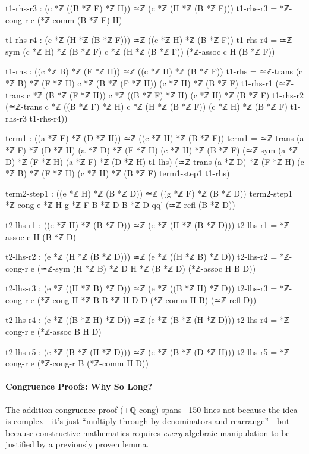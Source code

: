 \documentclass[11pt,a4paper]{book}
\def\texttt#1{#1}%
\begin{document}
\begin{code}
    t1-rhs-r3 : (c *ℤ ((B *ℤ F) *ℤ H)) ≃ℤ (c *ℤ (H *ℤ (B *ℤ F)))
    t1-rhs-r3 = *ℤ-cong-r c (*ℤ-comm (B *ℤ F) H)
    
    t1-rhs-r4 : (c *ℤ (H *ℤ (B *ℤ F))) ≃ℤ ((c *ℤ H) *ℤ (B *ℤ F))
    t1-rhs-r4 = ≃ℤ-sym {(c *ℤ H) *ℤ (B *ℤ F)} {c *ℤ (H *ℤ (B *ℤ F))} (*ℤ-assoc c H (B *ℤ F))
    
    t1-rhs : ((c *ℤ B) *ℤ (F *ℤ H)) ≃ℤ ((c *ℤ H) *ℤ (B *ℤ F))
    t1-rhs = ≃ℤ-trans {(c *ℤ B) *ℤ (F *ℤ H)} {c *ℤ (B *ℤ (F *ℤ H))} {(c *ℤ H) *ℤ (B *ℤ F)} t1-rhs-r1
             (≃ℤ-trans {c *ℤ (B *ℤ (F *ℤ H))} {c *ℤ ((B *ℤ F) *ℤ H)} {(c *ℤ H) *ℤ (B *ℤ F)} t1-rhs-r2
             (≃ℤ-trans {c *ℤ ((B *ℤ F) *ℤ H)} {c *ℤ (H *ℤ (B *ℤ F))} {(c *ℤ H) *ℤ (B *ℤ F)} t1-rhs-r3 t1-rhs-r4))

    term1 : ((a *ℤ F) *ℤ (D *ℤ H)) ≃ℤ ((c *ℤ H) *ℤ (B *ℤ F))
    term1 = ≃ℤ-trans {(a *ℤ F) *ℤ (D *ℤ H)} {(a *ℤ D) *ℤ (F *ℤ H)} {(c *ℤ H) *ℤ (B *ℤ F)}
              (≃ℤ-sym {(a *ℤ D) *ℤ (F *ℤ H)} {(a *ℤ F) *ℤ (D *ℤ H)} t1-lhs)
              (≃ℤ-trans {(a *ℤ D) *ℤ (F *ℤ H)} {(c *ℤ B) *ℤ (F *ℤ H)} {(c *ℤ H) *ℤ (B *ℤ F)} term1-step1 t1-rhs)

    term2-step1 : ((e *ℤ H) *ℤ (B *ℤ D)) ≃ℤ ((g *ℤ F) *ℤ (B *ℤ D))
    term2-step1 = *ℤ-cong {e *ℤ H} {g *ℤ F} {B *ℤ D} {B *ℤ D} qq' (≃ℤ-refl (B *ℤ D))
    
    t2-lhs-r1 : ((e *ℤ H) *ℤ (B *ℤ D)) ≃ℤ (e *ℤ (H *ℤ (B *ℤ D)))
    t2-lhs-r1 = *ℤ-assoc e H (B *ℤ D)
    
    t2-lhs-r2 : (e *ℤ (H *ℤ (B *ℤ D))) ≃ℤ (e *ℤ ((H *ℤ B) *ℤ D))
    t2-lhs-r2 = *ℤ-cong-r e (≃ℤ-sym {(H *ℤ B) *ℤ D} {H *ℤ (B *ℤ D)} (*ℤ-assoc H B D))
    
    t2-lhs-r3 : (e *ℤ ((H *ℤ B) *ℤ D)) ≃ℤ (e *ℤ ((B *ℤ H) *ℤ D))
    t2-lhs-r3 = *ℤ-cong-r e (*ℤ-cong {H *ℤ B} {B *ℤ H} {D} {D} (*ℤ-comm H B) (≃ℤ-refl D))
    
    t2-lhs-r4 : (e *ℤ ((B *ℤ H) *ℤ D)) ≃ℤ (e *ℤ (B *ℤ (H *ℤ D)))
    t2-lhs-r4 = *ℤ-cong-r e (*ℤ-assoc B H D)
    
    t2-lhs-r5 : (e *ℤ (B *ℤ (H *ℤ D))) ≃ℤ (e *ℤ (B *ℤ (D *ℤ H)))
    t2-lhs-r5 = *ℤ-cong-r e (*ℤ-cong-r B (*ℤ-comm H D))
\end{code}

\paragraph{Congruence Proofs: Why So Long?}
The addition congruence proof (\texttt{+ℚ-cong}) spans ~150 lines not because the idea 
is complex—it's just ``multiply through by denominators and rearrange''—but because 
constructive mathematics requires \emph{every} algebraic manipulation to be justified 
by a previously proven lemma.
\end{document}
